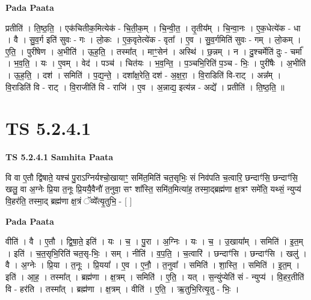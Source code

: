 \documentclass[17pt]{extarticle}
\begin{document}
\textbf{Pada Paata} \newline

प्रतीति॑ । ति॒ष्ठ॒ति॒ । एक॑चितीक॒मित्येक॑ - चि॒ती॒क॒म् । चि॒न्वी॒त॒ । तृ॒तीय᳚म् । चि॒न्वा॒नः । ए॒क॒धेत्ये॑क - धा । वै । सु॒व॒र्ग इति॑ सुवः - गः । लो॒कः । ए॒क॒वृतेत्ये॑क - वृता᳚ । ए॒व । सु॒व॒र्गमिति॑ सुवः - गम् । लो॒कम् । ए॒ति॒ । पुरी॑षेण । अ॒भीति॑ । ऊ॒ह॒ति॒ । तस्मा᳚त् । माꣳ॒॒सेन॑ । अस्थि॑ । छ॒न्नम् । न । दु॒श्चर्मेति॑ दुः - चर्मा᳚ । भ॒व॒ति॒ । यः । ए॒वम् । वेद॑ । पञ्च॑ । चित॑यः । भ॒व॒न्ति॒ । प॒ञ्चभि॒रिति॑ प॒ञ्च - भिः॒ । पुरी॑षैः । अ॒भीति॑ । ऊ॒ह॒ति॒ । दश॑ । समिति॑ । प॒द्य॒न्ते॒ । दशा᳚क्ष॒रेति॒ दश॑ - अ॒क्ष॒रा॒ । वि॒राडिति॑ वि-राट् । अन्न᳚म् । वि॒राडिति॑ वि - राट् । वि॒राजीति॑ वि - राजि॑ । ए॒व । अ॒न्नाद्य॒ इत्य॑न्न - अद्ये᳚ । प्रतीति॑ । ति॒ष्ठ॒ति॒ ॥  \newline





\section{ TS 5.2.4.1 }

\textbf{TS 5.2.4.1 } \newline
\textbf{Samhita Paata} \newline

वि वा ए॒तौ द्वि॑षाते॒ यश्च॑ पु॒राऽग्निर्यश्चो॒खायाꣳ॒॒ समि॑त॒मिति॑ चत॒सृभिः॒ सं निव॑पति च॒त्वारि॒ छन्दाꣳ॑सि॒ छन्दाꣳ॑सि॒ खलु॒ वा अ॒ग्नेः प्रि॒या त॒नूः प्रि॒ययै॒वैनौ॑ त॒नुवा॒ सꣳ शा᳚स्ति॒ समि॑त॒मित्या॑ह॒ तस्मा॒द्ब्रह्म॑णा क्ष॒त्रꣳ समे॑ति॒ यथ्सं॒ न्युप्य॑ वि॒हर॑ति॒ तस्मा॒द् ब्रह्म॑णा क्ष॒त्रं ॅव्ये᳚त्यृ॒तुभि॒ - [  ] \newline

\textbf{Pada Paata} \newline

वीति॑ । वै । ए॒तौ । द्वि॒षा॒ते॒ इति॑ । यः । च॒ । पु॒रा । अ॒ग्निः । यः । च॒ । उ॒खाया᳚म् । समिति॑ । इ॒त॒म् । इति॑ । च॒त॒सृभि॒रिति॑ चत॒सृ-भिः॒ । सम् । नीति॑ । व॒प॒ति॒ । च॒त्वारि॑ । छन्दाꣳ॑सि । छन्दाꣳ॑सि । खलु॑ । वै । अ॒ग्नेः । प्रि॒या । त॒नूः । प्रि॒यया᳚ । ए॒व । ए॒नौ॒ । त॒नुवा᳚ । समिति॑ । शा॒स्ति॒ । समिति॑ । इ॒त॒म् । इति॑ । आ॒ह॒ । तस्मा᳚त् । ब्रह्म॑णा । क्ष॒त्रम् । समिति॑ । ए॒ति॒ । यत् । स॒न्युंप्येति॑ सं - न्युप्य॑ । वि॒हर॒तीति॑ वि - हर॑ति । तस्मा᳚त् । ब्रह्म॑णा । क्ष॒त्रम् । वीति॑ । ए॒ति॒ । ऋ॒तुभि॒रित्यृ॒तु - भिः॒ ।  \newline




\end{document}
